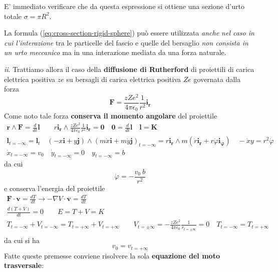 E' immediato verificare che da questa espressione si ottiene una sezione d'urto totale $\sigma = \pi R^2$.


La formula (\ref{eq:cross-section-rigid-sphere}) può essere utilizzata \emph{anche nel caso in cui l'interazione} tra le
particelle del fascio e quelle del bersaglio \emph{non consista in un urto meccanico} ma in una interazione mediata da una
forza naturale.

 \emph{ii}.
Trattiamo allora il caso della \textbf{diffusione di Rutherford} di proiettili di carica elettrica positiva $ze$ su bersagli di carica elettrica positiva $Ze$ governata dalla forza
\[
	\bm{F} = \frac{zZe^2}{4 \pi \epsilon_0}\frac{1}{r^2}\bm{i_r}
\]
Come noto tale forza \textbf{conserva il momento angolare} del proiettile
\begin{gather*}
	\bm{r} \wedge \bm{F} = \frac{d}{dt}\bm{l} \qquad r \bm{i_r} \wedge \frac{zZe^2}{4 \pi \epsilon_0}\frac{1}{r^2}\bm{i_r} = \bm{0} \quad \bm{0} = \frac{d}{dt}\bm{l} \quad \bm{l}=\bm{K}\\
	\bm{l}_{t = - \infty} = \bm{l}_t \quad (-x \bm{i} + y \bm{j})\wedge(m \dot{x}\bm{i} + m\dot{y}\bm{j})_{t = - \infty} = r \bm{i_r} \wedge m(\dot{r}\bm{i_r} + r \dot{\varphi}\bm{i_{\varphi}}) \quad - \dot{x}y = r^2 \dot{\varphi}\\
	\dot{x}_{t = - \infty} = v_0 \quad \dot{y}_{t = - \infty} = 0 \quad y_{t = - \infty}= b
\end{gather*} da cui
\begin{equation}
	\dot{\varphi} = - \frac{v_0 \ b}{r^2}
\end{equation}
e conserva l'energia del proiettile
\begin{gather*}
	\bm{F} \cdot \bm{v} = \frac{dT}{dt} \rightarrow - \nabla V \cdot \bm{v} = \frac{dT}{dt}\\
	\frac{d(T + V)}{dt} = 0 \qquad E = T + V = K\\
	T_{t = - \infty}+ V_{t = - \infty} = T_{t = + \infty}+ V_{t = + \infty} \qquad V_{t = \pm \infty} =
	- \frac{zZe^2}{4 \pi \epsilon_0}\frac{1}{r_{t = \pm \infty}} = 0 \quad T_{t = - \infty}=T_{t = + \infty}\\
\end{gather*}
da cui si ha
\begin{equation}
	v_0 = v_{t = + \infty}
\end{equation}
Fatte queste premesse conviene risolvere la sola \textbf{equazione del moto trasversale}:
